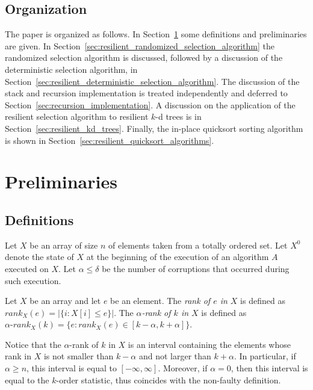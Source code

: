 \documentclass{llncs}
\begin{document}
\subsection{Organization}

The paper is organized as follows.
In Section~\ref{sec:preliminaries} some definitions and preliminaries are given.
In Section~\ref{sec:resilient_randomized_selection_algorithm} the randomized selection algorithm is discussed,
followed by a discussion of the deterministic selection algorithm, in Section~\ref{sec:resilient_deterministic_selection_algorithm}.
The discussion of the stack and recursion implementation is treated independently and deferred to Section~\ref{sec:recursion_implementation}.
A discussion on the application of the resilient selection algorithm to resilient $k$-d trees
is in Section~\ref{sec:resilient_kd_trees}. 
Finally, the in-place quicksort sorting algorithm is shown in Section~\ref{sec:resilient_quicksort_algorithms}.

















\section{Preliminaries}
\label{sec:preliminaries}

\subsection{Definitions}

Let $X$ be an array of size $n$ of elements taken from a totally ordered set. Let $X^0$ denote the state of $X$ at the beginning of the execution of an algorithm $A$ executed on $X$. Let $\alpha \leq \delta$ be the number of corruptions that occurred during such execution.

\begin{definition}
Let $X$ be an array and let $e$ be an element. The \emph{rank of $e$ in $X$} is defined as $rank_X(e) = |\{i : X[i] \leq e\}|$. The \emph{$\alpha$-rank of $k$ in $X$} is defined as $\alpha\text{-}rank_X(k) = \{e : rank_X(e) \in [k - \alpha, k + \alpha]\}$.
\end{definition}

Notice that the $\alpha$-rank of $k$ in $X$ is an interval containing the elements whose rank in $X$ is not smaller than $k - \alpha$ and not larger than $k + \alpha$. In particular, if $\alpha \geq n$, this interval is equal to $[-\infty,\infty]$.
Moreover, if $\alpha = 0$, then this interval is equal to the $k$-order statistic, thus coincides with the non-faulty definition.
\end{document}
